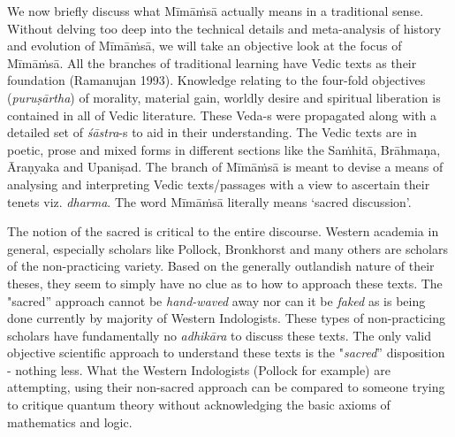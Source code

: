 \vskip 3pt

We now briefly discuss what Mīmāṁsā actually means in a traditional sense. Without delving too deep into the technical details and meta-analysis of history and evolution of Mīmāṁsā, we will take an objective look at the focus of Mīmāṁsā. All the branches of traditional learning have Vedic texts as their foundation (Ramanujan 1993). Knowledge relating to the four-fold objectives (\textit{puruṣārtha}) of morality, material gain, worldly desire and spiritual liberation is contained in all of Vedic literature. These Veda-s were propagated along with a detailed set of \textit{śāstra}-s to aid in their understanding. The Vedic texts are in poetic, prose and mixed forms in different sections like the Saṁhitā, Brāhmaṇa, Āraṇyaka and Upaniṣad. The branch of Mīmāṁsā is meant to devise a means of analysing and interpreting Vedic texts/passages with a view to ascertain their tenets viz. \textit{dharma}. The word Mīmāṁsā literally means ‘sacred discussion’.

\vskip 3pt

The notion of the sacred is critical to the entire discourse. Western academia in general, especially scholars like Pollock, Bronkhorst and many others are scholars of the non-practicing variety. Based on the generally outlandish nature of their theses, they seem to simply have no clue as to how to approach these texts. The "sacred” approach cannot be \textit{hand-waved} away nor can it be \textit{faked} as is being done currently by majority of Western Indologists. These types of non-practicing scholars have fundamentally no \textit{adhikāra} to discuss these texts. The only valid objective scientific approach to understand these texts is the "\textit{sacred}” disposition - nothing less. What the Western Indologists (Pollock for example) are attempting, using their non-sacred approach can be compared to someone trying to critique quantum theory without acknowledging the basic axioms of mathematics and logic.

\vskip 3pt

